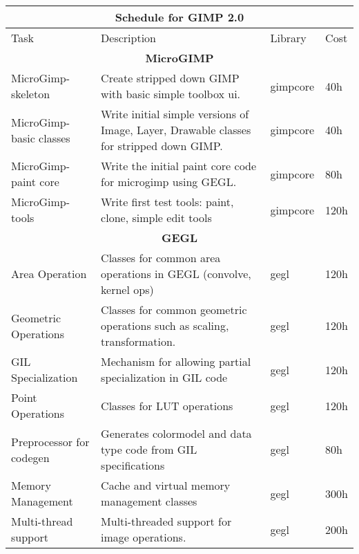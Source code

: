 \begin{flushleft}		
\begin{tabular}{|p{2cm}|p{5cm}|p{2cm}|l|}\hline
\multicolumn{4}{|c|}{\rule[-3mm]{0mm}{8mm} \large \bf Schedule for GIMP 2.0}\\  
\hline
Task & Description & Library & Cost\\ 
\hline 

\multicolumn{4}{|c|}{\bf MicroGIMP}\\
\hline
MicroGimp-skeleton & Create stripped down GIMP with basic simple toolbox ui. & gimpcore & 40h\\
\hline
MicroGimp-basic classes & Write initial simple versions of Image, Layer, Drawable classes for stripped down GIMP. & gimpcore & 40h\\
\hline
MicroGimp-paint core & Write the initial paint core code for microgimp using GEGL. & gimpcore & 80h\\
\hline
MicroGimp-tools & Write first test tools: paint, clone, simple edit tools  & gimpcore & 120h\\
\hline

\multicolumn{4}{|c|}{\bf GEGL}\\
\hline
Area Operation & Classes for common area operations in GEGL (convolve, kernel ops) & gegl & 120h\\
\hline
\raggedright{Geometric\\ Operations} & Classes for common geometric operations such as scaling, transformation. & gegl & 120h\\
\hline
GIL Specialization & Mechanism for allowing partial specialization in GIL code & gegl & 120h\\
\hline
Point Operations & Classes for LUT operations & gegl & 120h\\
\hline
\raggedright{Preprocessor for\\ codegen} & Generates colormodel and data type code from GIL specifications & gegl & 80h\\
\hline
\raggedright{Memory \\Management} & \raggedright{Cache and virtual memory management classes} & gegl & 300h\\
\hline
\raggedright{Multi-thread \\support} & \raggedright{Multi-threaded support for image operations.} & gegl & 200h\\  
\hline


\end{tabular}
\end{flushleft}
